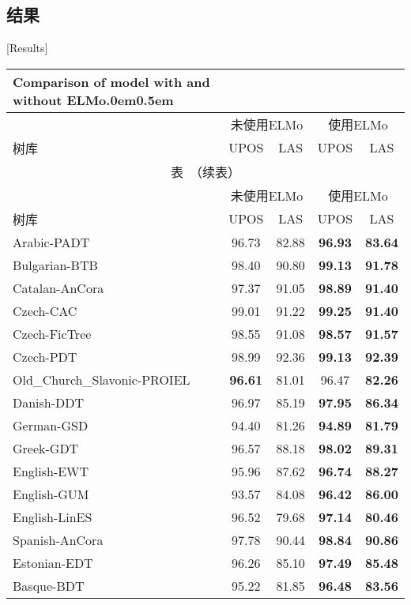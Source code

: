 \subsection{结果}[Results]\label{sec:seq:exp:results}
\ltfontsize{\wuhao}
\begin{longtable}{p{5cm}cccc}%
	\longbionenumcaption{}{在通用依存句法分析中使用ELMo的比较。}{Table $\!$}
	{}{Comparison of model with and without ELMo.\label{tbl:seq:main-result}}{0em}{0.5em}\\
	\toprule[1.5pt] & \multicolumn{2}{c}{未使用ELMo} & \multicolumn{2}{c}{使用ELMo}\\ 
	树库 & UPOS & LAS & UPOS & LAS\\ \midrule[1pt]
	\endfirsthead
	\multicolumn{5}{c}{表~\thetable（续表）}\vspace{0.5em}\\
	\toprule[1.5pt] & \multicolumn{2}{c}{未使用ELMo} & \multicolumn{2}{c}{使用ELMo}\\ 
	树库 & UPOS & LAS & UPOS & LAS \\
	\midrule[1pt]
	\endhead
	\bottomrule[1.5pt]
	\endfoot
Arabic-PADT & 96.73 & 82.88 & \bf 96.93 & \bf 83.64 \\
Bulgarian-BTB & 98.40 & 90.80 & \bf 99.13 & \bf 91.78 \\
Catalan-AnCora & 97.37 & 91.05 & \bf 98.89 & \bf 91.40 \\
Czech-CAC & 99.01 & 91.22 & \bf 99.25 & \bf 91.40 \\
Czech-FicTree & 98.55 & 91.08 & \bf 98.57 & \bf 91.57 \\
Czech-PDT & 98.99 & 92.36 & \bf 99.13 & \bf 92.39 \\
Old\_Church\_Slavonic-PROIEL & \bf 96.61 & 81.01 & 96.47 & \bf 82.26 \\
Danish-DDT & 96.97 & 85.19 & \bf 97.95 & \bf 86.34 \\
German-GSD & 94.40 & 81.26 & \bf 94.89 & \bf 81.79 \\
Greek-GDT & 96.57 & 88.18 & \bf 98.02 & \bf 89.31 \\
English-EWT & 95.96 & 87.62 & \bf 96.74 & \bf 88.27 \\
English-GUM & 93.57 & 84.08 & \bf 96.42 & \bf 86.00 \\
English-LinES & 96.52 & 79.68 & \bf 97.14 & \bf 80.46 \\
Spanish-AnCora & 97.78 & 90.44 & \bf 98.84 & \bf 90.86 \\
Estonian-EDT & 96.26 & 85.10 & \bf 97.49 & \bf 85.48 \\
Basque-BDT & 95.22 & 81.85 & \bf 96.48 & \bf 83.56 \\

\end{longtable}
